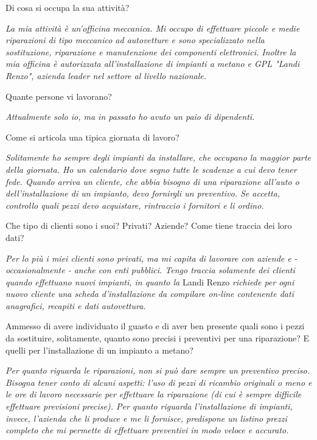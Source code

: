 		\begin{description}
			\item[A] 
				Di cosa si occupa la sua attività?
			\item[AS] 
				\emph{La mia attività è un'officina meccanica. Mi occupo di effettuare piccole e medie riparazioni di tipo meccanico ad autovetture e sono specializzato nella sostituzione, riparazione e manutenzione dei componenti elettronici. Inoltre la mia officina è autorizzata all'installazione di impianti a metano e GPL "Landi Renzo", azienda leader nel settore al livello nazionale.}
			\item[A]
				Quante persone vi lavorano?
			\item[AS]
				\emph{Attualmente solo io, ma in passato ho avuto un paio di dipendenti.}
			\item[A]
				Come si articola una tipica giornata di lavoro?
			\item[AS]
				\emph{Solitamente ho sempre degli impianti da installare, che occupano la maggior parte della giornata. Ho un calendario dove segno tutte le scadenze a cui devo tener fede. Quando arriva un cliente, che abbia bisogno di una riparazione all'auto o dell'installazione di un impianto, devo fornirgli un preventivo. Se accetta, controllo quali pezzi devo acquistare, rintraccio i fornitori e li ordino.}
			\item[A]
				Che tipo di clienti sono i suoi? Privati? Aziende? Come tiene traccia dei loro dati?
			\item[AS]
				\emph{Per lo più i miei clienti sono privati, ma mi capita di lavorare con aziende e - occasionalmente - anche con enti pubblici. Tengo traccia solamente dei clienti quando effettuano nuovi impianti, in quanto la} Landi Renzo \emph{richiede per ogni nuovo cliente una scheda d'installazione da compilare on-line contenente dati anagrafici, recapiti e dati autovettura.}
			\item[A]
				Ammesso di avere individuato il guasto e di aver ben presente quali sono i pezzi da sostituire, solitamente, quanto sono precisi i preventivi per una riparazione? E quelli per l'installazione di un impianto a metano?
 			\item[AS]
 				\emph{Per quanto riguarda le riparazioni, non si può dare sempre un preventivo preciso. Bisogna tener conto di alcuni aspetti: l'uso di pezzi di ricambio originali o meno e le ore di lavoro necessarie per effettuare la riparazione (di cui è sempre difficile effettuare previsioni precise). Per quanto riguarda l'installazione di impianti, invece, l'azienda che li produce e me li fornisce, predispone un listino prezzi completo che mi permette di effettuare preventivi in modo veloce e accurato.}

\end{description}
